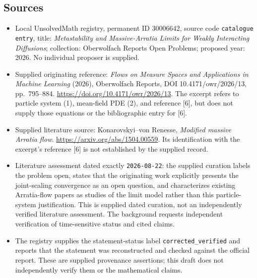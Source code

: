 \documentclass[11pt]{article}
\begin{document}
\subsection{Sources}
\begin{itemize}
\item Local UnsolvedMath registry, permanent ID \(30006642\), source code \texttt{catalogue entry}, title: \emph{Metastability and Massive-Arratia Limits for Weakly Interacting Diffusions}; collection: Oberwolfach Reports Open Problems; proposed year: 2026. No individual proposer is supplied.
\item Supplied originating reference: \emph{Flows on Measure Spaces and Applications in Machine Learning} (2026), Oberwolfach Reports, DOI 10.4171/owr/2026/13, pp.~795--884. \url{https://doi.org/10.4171/owr/2026/13}. The excerpt refers to particle system (1), mean-field PDE (2), and reference [6], but does not supply those equations or the bibliographic entry for [6].
\item Supplied literature source: Konarovskyi--von Renesse, \emph{Modified massive Arratia flow}. \url{https://arxiv.org/abs/1504.00559}. Its identification with the excerpt's reference [6] is not established by the supplied record.
\item Literature assessment dated exactly \texttt{2026-08-22}: the supplied curation labels the problem open, states that the originating work explicitly presents the joint-scaling convergence as an open question, and characterizes existing Arratia-flow papers as studies of the limit model rather than this particle-system justification. This is supplied dated curation, not an independently verified literature assessment. The background requests independent verification of time-sensitive status and cited claims.
\item The registry supplies the statement-status label \texttt{corrected\_verified} and reports that the statement was reconstructed and checked against the official report. These are supplied provenance assertions; this draft does not independently verify them or the mathematical claims.
\end{itemize}
\end{document}
